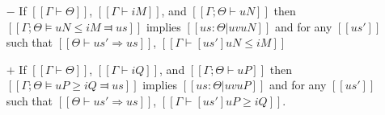 \begin{theorem} \hfill
    \begin{itemize}
        \item [$-$] 
        If $[[Γ ⊢ Θ]]$, $[[Γ ⊢ iM]]$, and $[[Γ ; Θ ⊢ uN]]$ then\\ 
        $[[Γ ; Θ ⊨ uN ≤ iM ⫤ us]]$
        implies $[[us : Θ|uv uN]]$ and 
        for any $[[us']]$ such that $[[Θ ⊢ us' ⇒ us]]$,
        $[[ Γ ⊢ [us']uN ≤ iM ]]$

        \item [$+$] 
        If $[[Γ ⊢ Θ]]$, $[[Γ ⊢ iQ]]$, and $[[Γ ; Θ ⊢ uP]]$ then\\
        $[[Γ ; Θ ⊨ uP ≥ iQ ⫤ us]]$
        implies $[[us : Θ|uv uP]]$ and 
        for any $[[us']]$ such that $[[Θ ⊢ us' ⇒ us]]$,
        $[[ Γ ⊢ [us']uP ≥ iQ ]]$.
     \end{itemize}
\end{theorem}
